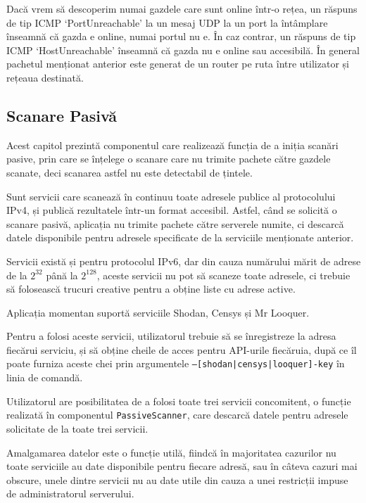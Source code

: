 	Dacă vrem să descoperim numai gazdele care sunt online într-o rețea, un răspuns de tip ICMP `PortUnreachable' la un mesaj UDP la un port la întâmplare înseamnă că gazda e online, numai portul nu e. În caz contrar, un răspuns de tip ICMP `HostUnreachable' înseamnă că gazda nu e online sau accesibilă. În general pachetul menționat anterior este generat de un router pe ruta între utilizator și rețeaua destinată.

\subsection*{Scanare Pasivă}

	Acest capitol prezintă componentul care realizează funcția de a iniția scanări pasive, prin care se înțelege o scanare care nu trimite pachete către gazdele scanate, deci scanarea astfel nu este detectabil de țintele.
	
	Sunt servicii care scanează în continuu toate adresele publice al protocolului IPv4, și publică rezultatele într-un format accesibil. Astfel, când se solicită o scanare pasivă, aplicația nu trimite pachete către serverele numite, ci descarcă datele disponibile pentru adresele specificate de la serviciile menționate anterior.
	
	Servicii există și pentru protocolul IPv6, dar din cauza numărului mărit de adrese de la $ 2^{32} $ până la $ 2^{128} $, aceste servicii nu pot să scaneze toate adresele, ci trebuie să folosească trucuri creative pentru a obține liste cu adrese active.
	
	Aplicația momentan suportă serviciile Shodan\cite{shodan16}, Censys\cite{censys15} și Mr Looquer\cite{looquer16}.
	
	Pentru a folosi aceste servicii, utilizatorul trebuie să se înregistreze la adresa fiecărui serviciu, și să obține cheile de acces pentru API-urile fiecăruia, după ce îl poate furniza aceste chei prin argumentele \texttt{--[shodan|censys|looquer]-key} în linia de comandă.
	
	Utilizatorul are posibilitatea de a folosi toate trei servicii concomitent, o funcție realizată în componentul \texttt{PassiveScanner}, care descarcă datele pentru adresele solicitate de la toate trei servicii.
	
	Amalgamarea datelor este o funcție utilă, fiindcă în majoritatea cazurilor nu toate serviciile au date disponibile pentru fiecare adresă, sau în câteva cazuri mai obscure, unele dintre servicii nu au date utile din cauza a unei restricții impuse de administratorul serverului.

